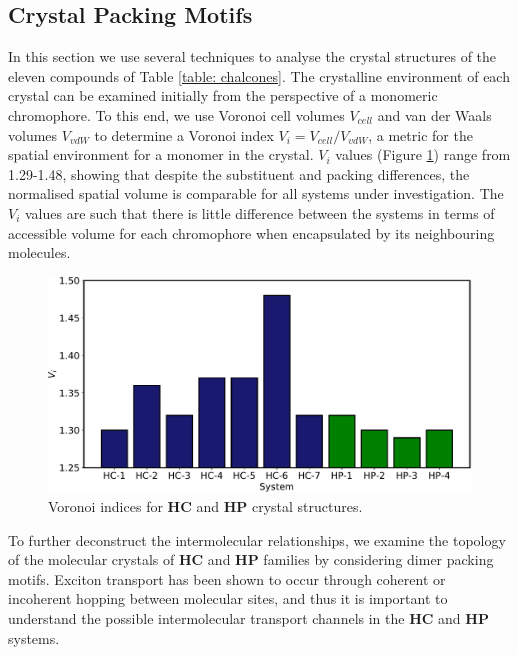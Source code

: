\subsection{Crystal Packing Motifs} \label{section: Connecting_Motifs}
In this section we use several techniques to analyse the crystal structures of the eleven compounds of Table \ref{table: chalcones}. The crystalline environment of each crystal can be examined initially from the perspective of a monomeric chromophore. To this end, we use Voronoi cell volumes $V_{cell}$ and van der Waals volumes $V_{vdW}$ to determine a Voronoi index $V_{i}=V_{cell}/V_{vdW}$, a metric for the spatial environment for a monomer in the crystal. $V_{i}$ values (Figure \ref{figure: voronoi_index})  range from 1.29-1.48, showing that despite the substituent and packing differences, the  normalised spatial volume is comparable for all systems under investigation.  The $V_{i}$ values are such that there is little difference between the systems in terms of accessible volume for each chromophore when encapsulated by its neighbouring molecules.
\begin{figure}[H]
\centering
  \includegraphics[width=0.8\linewidth]{5ConnectingCrystalStructure/Voronoi_Index}
  \caption{Voronoi indices for \textbf{HC} and \textbf{HP} crystal structures.}
  \label{figure: voronoi_index}
\end{figure}
To further deconstruct the intermolecular relationships, we examine the topology of the molecular crystals of \textbf{HC} and \textbf{HP} families by considering dimer packing motifs. Exciton transport has been shown to occur through coherent or incoherent hopping between molecular sites, and thus it is important to understand the possible intermolecular transport channels in the \textbf{HC} and \textbf{HP} systems.

